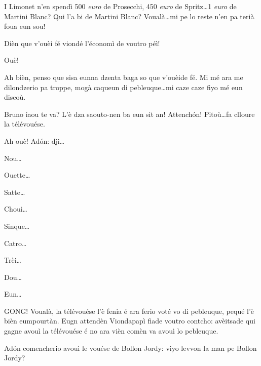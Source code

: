 \begin{drama}

\Jordyspeaks I Limonet n'en spendì 500 \textit{euro} de Prosecchi, 450 \textit{euro} de Spritz\ldots 1 \textit{euro} de Martini Blanc?  Qui l'a bi de Martini Blanc? Voualà\ldots mi pe lo reste n'en pa terià foua eun sou!

\Brunospeaks Dièn que v'ouèi fé viondé l'économì de voutro péì!

\Jordyspeaks Ouè!

\Brunospeaks Ah bièn, penso que sisa eunna dzenta baga so que v'ouèide fé.  Mi mé ara me dilondzerio pa troppe, mogà caqueun di pebleuque\ldots mi caze caze fiyo mé eun discoù.

\scene[-- Votade!]


\Noteospeaks Bruno iaou te va? L'è dza saouto-nen ba eun sit an! Attench\'on! Pitoù\ldots fa clloure la télévouése.

\Brunospeaks Ah ouè! Ad\'on: dji\ldots

\Noteospeaks Nou\ldots

\Brunospeaks Ouette\ldots

\Noteospeaks Satte\ldots

\Brunospeaks Chouì\ldots

\Noteospeaks Sinque\ldots

\Brunospeaks Catro\ldots

\Noteospeaks Trèi\ldots

\Brunospeaks Dou\ldots

\Noteospeaks Eun\ldots


\Brunospeaks GONG! Voualà, la télévouése l'è fenia é ara ferio voté vo di pebleuque, pequé l'è bièn eumpourtàn. Eugn attendèn Viondapapì fiade voutro contcho: avèitsade qui gagne avouì la télévouése é no ara vièn comèn va avouì lo pebleuque.


\Brunospeaks {} Ad\'on comencherio avouì le vouése de Bollon Jordy: viyo levvon la man pe Bollon Jordy?



\end{drama}
